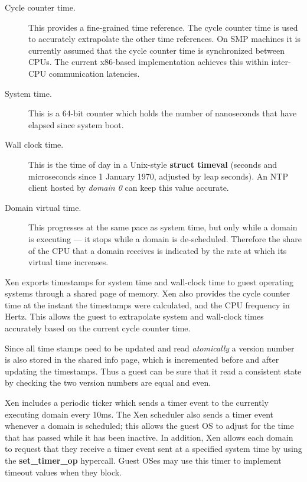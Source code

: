 \documentclass[11pt,twoside,final,openright,a4paper]{report}
\begin{document}
\begin{description}
\item[Cycle counter time.]

  This provides a fine-grained time reference.  The cycle counter time
  is used to accurately extrapolate the other time references.  On SMP
  machines it is currently assumed that the cycle counter time is
  synchronized between CPUs.  The current x86-based implementation
  achieves this within inter-CPU communication latencies.

\item[System time.]

  This is a 64-bit counter which holds the number of nanoseconds that
  have elapsed since system boot.

\item[Wall clock time.]

  This is the time of day in a Unix-style {\bf struct timeval}
  (seconds and microseconds since 1 January 1970, adjusted by leap
  seconds).  An NTP client hosted by {\it domain 0} can keep this
  value accurate.

\item[Domain virtual time.]

  This progresses at the same pace as system time, but only while a
  domain is executing --- it stops while a domain is de-scheduled.
  Therefore the share of the CPU that a domain receives is indicated
  by the rate at which its virtual time increases.

\end{description}


Xen exports timestamps for system time and wall-clock time to guest
operating systems through a shared page of memory.  Xen also provides
the cycle counter time at the instant the timestamps were calculated,
and the CPU frequency in Hertz.  This allows the guest to extrapolate
system and wall-clock times accurately based on the current cycle
counter time.

Since all time stamps need to be updated and read \emph{atomically}
a version number is also stored in the shared info page, which is
incremented before and after updating the timestamps. Thus a guest can
be sure that it read a consistent state by checking the two version
numbers are equal and even.

Xen includes a periodic ticker which sends a timer event to the
currently executing domain every 10ms.  The Xen scheduler also sends a
timer event whenever a domain is scheduled; this allows the guest OS
to adjust for the time that has passed while it has been inactive.  In
addition, Xen allows each domain to request that they receive a timer
event sent at a specified system time by using the {\bf
  set\_timer\_op} hypercall.  Guest OSes may use this timer to
implement timeout values when they block.
\end{document}
